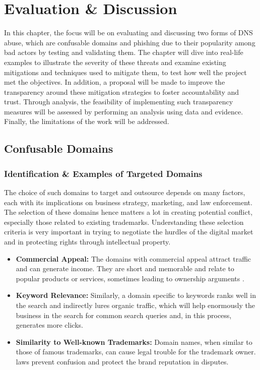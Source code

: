 \chapter{Evaluation \& Discussion}

In this chapter, the focus will be on evaluating and discussing two forms of DNS abuse, which are confusable domains and phishing due to their popularity among bad actors by testing and validating them.  The chapter will dive into real-life examples to illustrate the severity of these threats and examine existing mitigations and techniques used to mitigate them, to test how well the project met the objectives. In addition, a proposal will be made to improve the transparency around these mitigation strategies to foster accountability and trust. Through analysis, the feasibility of implementing such transparency measures will be assessed by performing an analysis using data and evidence. Finally, the limitations of the work will be addressed. 


\section{Confusable Domains}
\subsection{Identification \& Examples of Targeted Domains}

The choice of such domains to target and outsource depends on many factors, each with its implications on business strategy, marketing, and law enforcement. The selection of these domains hence matters a lot in creating potential conflict, especially those related to existing trademarks. Understanding these selection criteria is very important in trying to negotiate the hurdles of the digital market and in protecting rights through intellectual property.

\begin{itemize}
  \item \textbf{Commercial Appeal:} The domains with commercial appeal attract traffic and can generate income. They are short and memorable and relate to popular products or services, sometimes leading to ownership arguments \cite{Li2002ConflictDomainTrademark}.
  
  \item \textbf{Keyword Relevance:} Similarly, a domain specific to keywords ranks well in the search and indirectly lures organic traffic, which will help enormously the business in the search for common search queries and, in this process, generates more clicks.
  
  \item \textbf{Similarity to Well-known Trademarks:} Domain names, when similar to those of famous trademarks, can cause legal trouble for the trademark owner. laws prevent confusion and protect the brand reputation in disputes.
\end{itemize}

